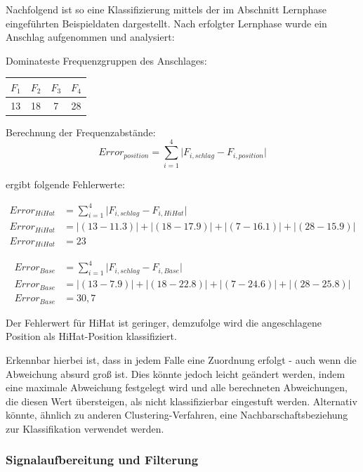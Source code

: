 Nachfolgend ist so eine Klassifizierung mittels der im Abschnitt Lernphase eingeführten Beispieldaten dargestellt. Nach erfolgter Lernphase wurde ein Anschlag aufgenommen und analysiert:

Dominateste Frequenzgruppen des Anschlages: 
\begin{tabular}{c c c c}
$F_1$ & $F_2$ & $F_3$ & $F_4$\\
\hline
 13  &	18 &	7 &	28\\
\end{tabular}

Berechnung der Frequenzabstände:
\begin{displaymath}
Error_{position} = \sum_{i=1}^{4} \lvert F_{i,schlag} - F_{i,position}\rvert
\end{displaymath}

ergibt folgende Fehlerwerte:


\begin{align*}
Error_{HiHat} &= \sum_{i=1}^{4}  \lvert F_{i,schlag} - F_{i,HiHat}\rvert \\
Error_{HiHat} &= \lvert(13-11.3)\rvert + \lvert(18-17.9)\rvert + \lvert(7-16.1)\rvert + \lvert(28-15.9)\rvert \\
Error_{HiHat} &= 23
\end{align*}


\begin{align*}
Error_{Base} &= \sum_{i=1}^{4} \lvert F_{i,schlag} - F_{i,Base}\rvert \\
Error_{Base} &= \lvert (13-7.9)\rvert + \lvert(18-22.8)\rvert + \lvert(7-24.6)\rvert + \lvert(28-25.8)\rvert \\
Error_{Base} &= 30,7
\end{align*}

Der Fehlerwert für HiHat ist geringer, demzufolge wird die angeschlagene Position als HiHat-Position klassifiziert.
 
Erkennbar hierbei ist, dass in jedem Falle eine Zuordnung erfolgt - auch wenn die Abweichung absurd groß ist. Dies könnte jedoch leicht geändert werden, indem eine maximale Abweichung festgelegt wird und alle berechneten Abweichungen, die diesen Wert übersteigen, als nicht klassifizierbar eingestuft werden. Alternativ könnte, ähnlich zu anderen Clustering-Verfahren, eine Nachbarschaftsbeziehung zur Klassifikation verwendet werden.

\subsubsection*{Signalaufbereitung und Filterung}

